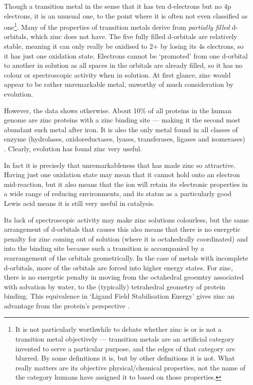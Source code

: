 Though a transition metal in the sense that it has ten d-electrons but no 4p electrons, it is an unusual one, to the point where it is often not even classified as one\footnote{It is not particularly worthwhile to debate whether zinc is or is not a transition metal objectively --- transition metals are an artificial category invented to serve a particular purpose, and the edges of that category are blurred. By some definitions it is, but by other definitions it is not. What really matters are its objective physical/chemical properties, not the name of the category humans have assigned it to based on those properties.}. Many of the properties of transition metals derive from \emph{partially filled} d-orbitals, which zinc does not have. The five fully filled d-orbitals are relatively stable, meaning it can only really be oxidised to 2+ by losing its 4s electrons, so it has just one oxidation state. Electrons cannot be `promoted' from one d-orbital to another in solution as all spaces in the orbitals are already filled, so it has no colour or spectroscopic activity when in solution. At first glance, zinc would appear to be rather unremarkable metal, unworthy of much consideration by evolution.

However, the data shows otherwise. About 10\% of all proteins in the human genome are zinc proteins with a zinc binding site \cite{andreini2006counting} --- making it the second most abundant such metal after iron. It is also the only metal found in all classes of enzyme (hydrolases, oxidoreductases, lyases, transferases, ligases and isomerases) \cite{vallee1990zinc}. Clearly, evolution has found zinc very useful.

In fact it is precisely that unremarkableness that has made zinc so attractive. Having just one oxidation state may mean that it cannot hold onto an electron mid-reaction, but it also means that the ion will retain its electronic properties in a wide range of reducing environments, and its status as a particularly good Lewis acid means it is still very useful in catalysis. 

Its lack of spectroscopic activity may make zinc solutions colourless, but the same arrangement of d-orbitals that causes this also means that there is no energetic penalty for zinc coming out of solution (where it is octahedrally coordinated) and into the binding site because such a transition is accompanied by a rearrangement of the orbitals geometrically. In the case of metals with incomplete d-orbitals, more of the orbitals are forced into higher energy states. For zinc, there is no energetic penalty in moving from the octahedral geoemtry associated with solvation by water, to the (typically) tetrahedral geometry of protein binding. This equivalence in `Ligand Field Stabilisation Energy' gives zinc an advantage from the protein's perspective \cite{lachenmann2004zinc}.

